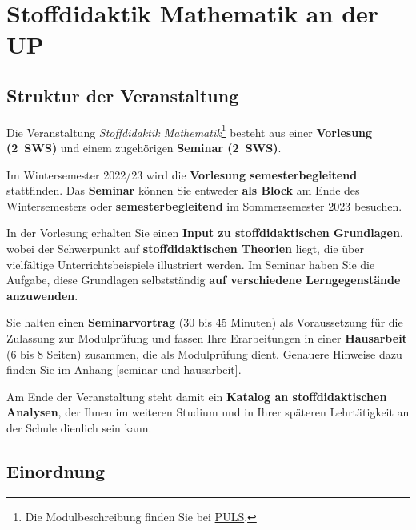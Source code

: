 \documentclass[
]{scrbook}
\theoremstyle{definition}
\theoremstyle{definition}
\theoremstyle{definition}
\theoremstyle{definition}
\theoremstyle{remark}
\begin{document}
\hypertarget{stoffdidaktik-mathematik-an-der-up}{%
\chapter*{Stoffdidaktik Mathematik an der UP}\label{stoffdidaktik-mathematik-an-der-up}}

\hypertarget{struktur-der-veranstaltung}{%
\section*{Struktur der Veranstaltung}\label{struktur-der-veranstaltung}}

Die Veranstaltung \emph{Stoffdidaktik Mathematik}\footnote{Die Modulbeschreibung finden Sie bei \href{https://puls.uni-potsdam.de/qisserver/rds?state=verpublish\&status=init\&vmfile=no\&moduleCall=modulansicht\&publishConfFile=modulverwaltung\&publishSubDir=up/modulbearbeiter\&\&modul.modul_id=3155\&menuid=\&topitem=Modulbeschreibung\&subitem=}{PULS}.} besteht aus einer \textbf{Vorlesung (2~SWS)} und einem zugehörigen \textbf{Seminar (2~SWS)}.

Im Wintersemester 2022/23 wird die \textbf{Vorlesung semesterbegleitend} stattfinden. Das \textbf{Seminar} können Sie entweder \textbf{als Block} am Ende des Wintersemesters oder \textbf{semesterbegleitend} im Sommersemester 2023 besuchen.

In der Vorlesung erhalten Sie einen \textbf{Input zu stoffdidaktischen Grundlagen}, wobei der Schwerpunkt auf \textbf{stoffdidaktischen Theorien} liegt, die über vielfältige Unterrichtsbeispiele illustriert werden. Im Seminar haben Sie die Aufgabe, diese Grundlagen selbstständig \textbf{auf verschiedene Lerngegenstände anzuwenden}.

Sie halten einen \textbf{Seminarvortrag} (30 bis 45 Minuten) als Voraussetzung für die Zulassung zur Modulprüfung und fassen Ihre Erarbeitungen in einer \textbf{Hausarbeit} (6 bis 8 Seiten) zusammen, die als Modulprüfung dient. Genauere Hinweise dazu finden Sie im Anhang \ref{seminar-und-hausarbeit}.

Am Ende der Veranstaltung steht damit ein \textbf{Katalog an stoffdidaktischen Analysen}, der Ihnen im weiteren Studium und in Ihrer späteren Lehrtätigkeit an der Schule dienlich sein kann.

\hypertarget{einordnung}{%
\section*{Einordnung}\label{einordnung}}
\end{document}
